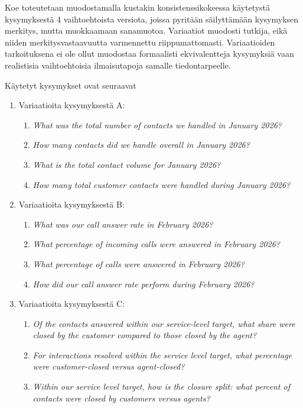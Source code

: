 Koe toteutetaan muodostamalla kustakin konsistenssikokeessa käytetystä
kysymyksestä 4 vaihtoehtoista versiota, joissa pyritään säilyttämään
kysymyksen merkitys, mutta muokkaamaan sanamuotoa. Variaatiot muodosti
tutkija, eikä niiden merkitysvastaavuutta varmennettu riippumattomasti.
Variaatioiden tarkoituksena ei ole ollut muodostaa formaalisti
ekvivalentteja kysymyksiä vaan realistisia vaihtoehtoisia ilmaisutapoja
samalle tiedontarpeelle.

Käytetyt kysymykset ovat seuraavat
\begin{enumerate}[label=\Alph*.]
    \label{it:q_sensitivity}
  \item Variaatioita kysymyksestä A:
    \begin{enumerate}[label=\arabic*.]
      \item \textit{What was the total number of contacts we handled in January 2026?}
      \item \textit{How many contacts did we handle overall in January 2026?}
      \item \textit{What is the total contact volume for January 2026?}
      \item \textit{How many total customer contacts were handled during January 2026?}
    \end{enumerate}
  \item Variaatioita kysymyksestä B:
    \begin{enumerate}[label=\arabic*.]
      \item \textit{What was our call answer rate in February 2026?}
      \item \textit{What percentage of incoming calls were answered in February 2026?}
      \item \textit{What percentage of calls were answered in February 2026?}
      \item \textit{How did our call answer rate perform during February 2026?}
    \end{enumerate}
  \item Variaatioita kysymyksestä C:
    \begin{enumerate}[label=\arabic*.]
      \item \textit{Of the contacts answered within our service-level target, what share were closed by the customer compared to those closed by the agent?}
      \item \textit{For interactions resolved within the service level target, what percentage were customer-closed versus agent-closed?}
      \item \textit{Within our service level target, how is the closure split: what percent of contacts were closed by customers versus agents?}

\end{enumerate}
\end{enumerate}
